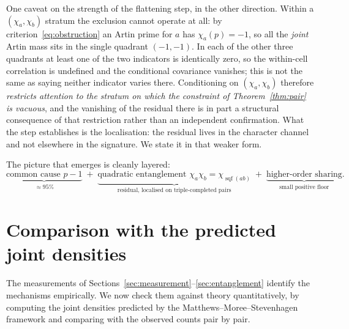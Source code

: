 \documentclass[11pt,reqno]{amsart}
\theoremstyle{plain}
\theoremstyle{definition}
\DeclareMathOperator{\sqf}{sqf}
\begin{document}
One caveat on the strength of the flattening step, in the other direction.
Within a $(\chi_a, \chi_b)$ stratum the exclusion cannot operate at all: by
criterion~\eqref{eq:obstruction} an Artin prime for $a$ has $\chi_a(p) = -1$, so all the \emph{joint} Artin mass sits in the single quadrant $(-1,-1)$. In each of the other three quadrants at least one of the two indicators is identically zero, so the within-cell correlation is undefined and the conditional covariance vanishes; this is not the same as saying neither indicator varies there. Conditioning on
$(\chi_a, \chi_b)$ therefore \emph{restricts attention to the stratum on which
the constraint of Theorem~\ref{thm:pair} is vacuous}, and the vanishing of the
residual there is in part a structural consequence of that restriction rather
than an independent confirmation. What the step establishes is the
localisation: the residual lives in the character channel and not elsewhere in
the signature. We state it in that weaker form.

The picture that emerges is cleanly layered:
\[
  \underbrace{\text{common cause } p-1}_{\approx 95\%}
  \;+\;
  \underbrace{\text{quadratic entanglement } \chi_a\chi_b = \chi_{\sqf(ab)}}_{\text{residual, localised on triple-completed pairs}}
  \;+\;
  \underbrace{\text{higher-order sharing}}_{\text{small positive floor}}.
\]

\section{Comparison with the predicted joint densities}
\label{sec:model}

The measurements of Sections~\ref{sec:measurement}--\ref{sec:entanglement}
identify the mechanisms empirically. We now check them against theory
quantitatively, by computing the joint densities predicted by the
Matthews--Moree--Stevenhagen framework and comparing with the observed counts pair by
pair.
\end{document}
